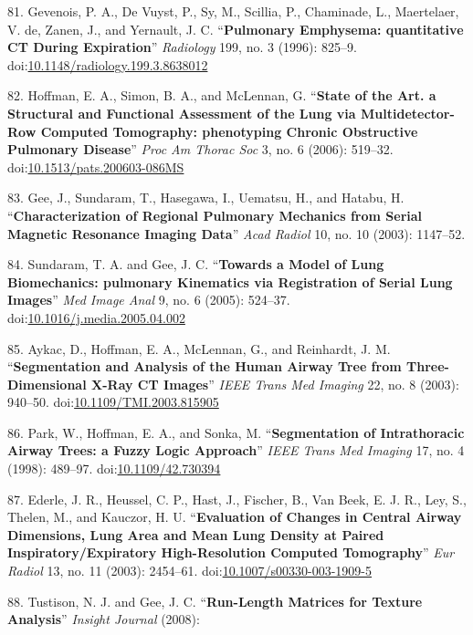 \documentclass[11pt,]{article}
\begin{document}
81. Gevenois, P. A., De Vuyst, P., Sy, M., Scillia, P., Chaminade, L.,
Maertelaer, V. de, Zanen, J., and Yernault, J. C. ``\textbf{Pulmonary
Emphysema: quantitative CT During Expiration}'' \emph{Radiology} 199,
no. 3 (1996): 825--9.
doi:\href{http://dx.doi.org/10.1148/radiology.199.3.8638012}{10.1148/radiology.199.3.8638012}

82. Hoffman, E. A., Simon, B. A., and McLennan, G. ``\textbf{State of
the Art. a Structural and Functional Assessment of the Lung via
Multidetector-Row Computed Tomography: phenotyping Chronic Obstructive
Pulmonary Disease}'' \emph{Proc Am Thorac Soc} 3, no. 6 (2006): 519--32.
doi:\href{http://dx.doi.org/10.1513/pats.200603-086MS}{10.1513/pats.200603-086MS}

83. Gee, J., Sundaram, T., Hasegawa, I., Uematsu, H., and Hatabu, H.
``\textbf{Characterization of Regional Pulmonary Mechanics from Serial
Magnetic Resonance Imaging Data}'' \emph{Acad Radiol} 10, no. 10 (2003):
1147--52.

84. Sundaram, T. A. and Gee, J. C. ``\textbf{Towards a Model of Lung
Biomechanics: pulmonary Kinematics via Registration of Serial Lung
Images}'' \emph{Med Image Anal} 9, no. 6 (2005): 524--37.
doi:\href{http://dx.doi.org/10.1016/j.media.2005.04.002}{10.1016/j.media.2005.04.002}

85. Aykac, D., Hoffman, E. A., McLennan, G., and Reinhardt, J. M.
``\textbf{Segmentation and Analysis of the Human Airway Tree from
Three-Dimensional X-Ray CT Images}'' \emph{IEEE Trans Med Imaging} 22,
no. 8 (2003): 940--50.
doi:\href{http://dx.doi.org/10.1109/TMI.2003.815905}{10.1109/TMI.2003.815905}

86. Park, W., Hoffman, E. A., and Sonka, M. ``\textbf{Segmentation of
Intrathoracic Airway Trees: a Fuzzy Logic Approach}'' \emph{IEEE Trans
Med Imaging} 17, no. 4 (1998): 489--97.
doi:\href{http://dx.doi.org/10.1109/42.730394}{10.1109/42.730394}

87. Ederle, J. R., Heussel, C. P., Hast, J., Fischer, B., Van Beek, E.
J. R., Ley, S., Thelen, M., and Kauczor, H. U. ``\textbf{Evaluation of
Changes in Central Airway Dimensions, Lung Area and Mean Lung Density at
Paired Inspiratory/Expiratory High-Resolution Computed Tomography}''
\emph{Eur Radiol} 13, no. 11 (2003): 2454--61.
doi:\href{http://dx.doi.org/10.1007/s00330-003-1909-5}{10.1007/s00330-003-1909-5}

88. Tustison, N. J. and Gee, J. C. ``\textbf{Run-Length Matrices for
Texture Analysis}'' \emph{Insight Journal} (2008):
\end{document}

